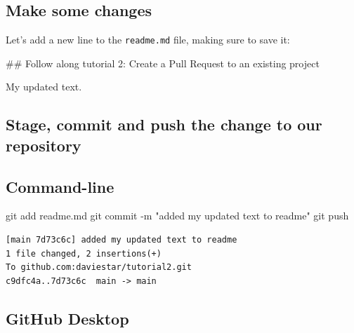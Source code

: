 \documentclass[
  letterpaper,
  DIV=11,
  numbers=noendperiod]{scrartcl}
\newenvironment{Shaded}{\begin{snugshade}}{\end{snugshade}}
\newcommand{\NormalTok}[1]{\textcolor[rgb]{0.00,0.23,0.31}{#1}}
\newcommand{\SpecialCharTok}[1]{\textcolor[rgb]{0.37,0.37,0.37}{#1}}
\newcommand{\StringTok}[1]{\textcolor[rgb]{0.13,0.47,0.30}{#1}}
\begin{document}
\subsection{Make some changes}\label{make-some-changes}

Let's add a new line to the \texttt{readme.md} file, making sure to save
it:

\begin{tcolorbox}[enhanced jigsaw, opacityback=0, opacitybacktitle=0.6, colback=white, breakable, leftrule=.75mm, arc=.35mm, title=\textcolor{quarto-callout-note-color}{\faInfo}\hspace{0.5em}{readme.md}, colbacktitle=quarto-callout-note-color!10!white, titlerule=0mm, rightrule=.15mm, colframe=quarto-callout-note-color-frame, bottomtitle=1mm, toptitle=1mm, bottomrule=.15mm, toprule=.15mm, left=2mm, coltitle=black]

\#\# Follow along tutorial 2: Create a Pull Request to an existing
project

My updated text.

\end{tcolorbox}

\subsection{Stage, commit and push the change to our
repository}\label{stage-commit-and-push-the-change-to-our-repository}

\subsection{Command-line}

\begin{Shaded}
\begin{Highlighting}[]
\NormalTok{git add readme.md}
\NormalTok{git commit }\SpecialCharTok{{-}}\NormalTok{m }\StringTok{"added my updated text to readme"}
\NormalTok{git push}
\end{Highlighting}
\end{Shaded}

\begin{verbatim}
[main 7d73c6c] added my updated text to readme
1 file changed, 2 insertions(+)
To github.com:daviestar/tutorial2.git
c9dfc4a..7d73c6c  main -> main
\end{verbatim}

\subsection{GitHub Desktop}
\end{document}
